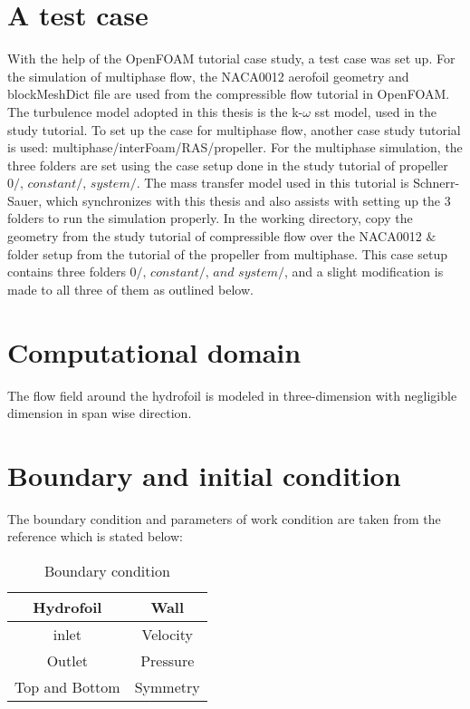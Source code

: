 \section{A test case}
With the help of the OpenFOAM tutorial case study, a test case was set up. For the simulation of multiphase flow, the NACA0012 aerofoil geometry and blockMeshDict file are used 
from the compressible flow tutorial in OpenFOAM. The turbulence model adopted in this thesis is the k-$\omega$ sst model, used in the study tutorial. To set up the case for multiphase flow, 
another case study tutorial is used: multiphase/interFoam/RAS/propeller. For the multiphase simulation, the three folders are set using the case setup done in the 
study tutorial of propeller $\textit {0/, constant/, system/}$. The mass transfer model used in this tutorial is Schnerr-Sauer, which synchronizes with this thesis and 
also assists with setting up the 3 folders to run the simulation properly. In the working directory, copy the geometry from the study tutorial of compressible flow over 
the NACA0012 $\&$ folder setup from the tutorial of the propeller from multiphase. This case setup contains three folders $\textit {0/, constant/, and system/}$, and a slight modification 
is made to all three of them as outlined below.
\section{Computational domain}
The flow field around the hydrofoil is modeled in three-dimension with negligible dimension in span wise direction. 
\section{Boundary and initial condition}
The boundary condition and parameters of work condition  are taken from the reference  \cite{Zhao2021} which is stated below:\\
\begin{table}[h]
    \centering
    \begin{tabular}{|c|c|}
    \hline
        Hydrofoil & Wall \\
    \hline
        inlet & Velocity \\ 
    \hline
       Outlet & Pressure  \\
    \hline
       Top and Bottom & Symmetry \\
   \hline
    \end{tabular}
    \caption{Boundary condition}
    \label{tab:BC}
\end{table}\\





